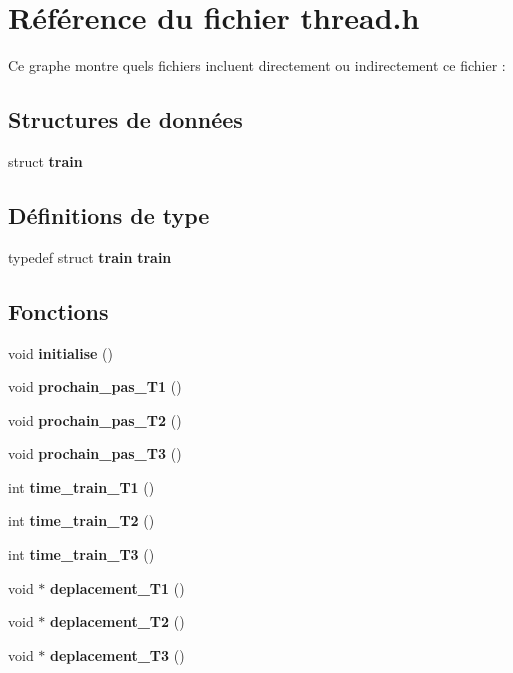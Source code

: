 \section{Référence du fichier thread.\+h}
\label{thread_8h}
Ce graphe montre quels fichiers incluent directement ou indirectement ce fichier \+:
\subsection*{Structures de données}
\begin{DoxyCompactItemize}
\item 
struct {\bf train}
\end{DoxyCompactItemize}
\subsection*{Définitions de type}
\begin{DoxyCompactItemize}
\item 
typedef struct {\bf train} {\bf train}
\end{DoxyCompactItemize}
\subsection*{Fonctions}
\begin{DoxyCompactItemize}
\item 
void {\bf initialise} ()
\item 
void {\bf prochain\+\_\+pas\+\_\+\+T1} ()
\item 
void {\bf prochain\+\_\+pas\+\_\+\+T2} ()
\item 
void {\bf prochain\+\_\+pas\+\_\+\+T3} ()
\item 
int {\bf time\+\_\+train\+\_\+\+T1} ()
\item 
int {\bf time\+\_\+train\+\_\+\+T2} ()
\item 
int {\bf time\+\_\+train\+\_\+\+T3} ()
\item 
void $\ast$ {\bf deplacement\+\_\+\+T1} ()
\item 
void $\ast$ {\bf deplacement\+\_\+\+T2} ()
\item 
void $\ast$ {\bf deplacement\+\_\+\+T3} ()
\end{DoxyCompactItemize}
